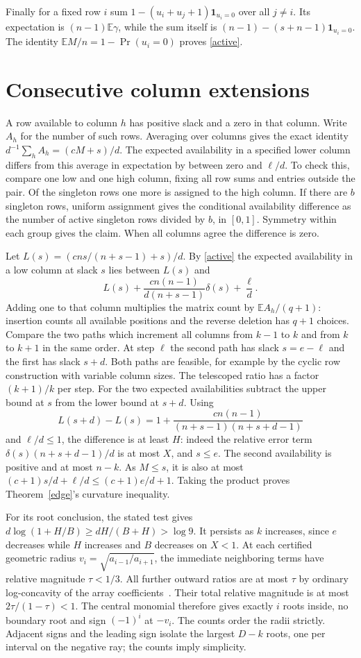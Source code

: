 \documentclass[11pt]{article}
\newcommand{\E}{\mathbb E}
\begin{document}
Finally for a fixed row $i$ sum $1-(u_i+u_j+1)\mathbf1_{u_i=0}$ over all $j\ne i$. Its expectation is $(n-1)\E\gamma$, while the sum itself is $(n-1)-(s+n-1)\mathbf1_{u_i=0}$. The identity $\E M/n=1-\Pr(u_i=0)$ proves \eqref{active}.

\section{Consecutive column extensions}
A row available to column $h$ has positive slack and a zero in that column. Write $A_h$ for the number of such rows. Averaging over columns gives the exact identity $d^{-1}\sum_h A_h=(cM+s)/d$. The expected availability in a specified lower column differs from this average in expectation by between zero and $\ell/d$. To check this, compare one low and one high column, fixing all row sums and entries outside the pair. Of the singleton rows one more is assigned to the high column. If there are $b$ singleton rows, uniform assignment gives the conditional availability difference as the number of active singleton rows divided by $b$, in $[0,1]$. Symmetry within each group gives the claim. When all columns agree the difference is zero.

Let $L(s)=(cns/(n+s-1)+s)/d$. By \eqref{active} the expected availability in a low column at slack $s$ lies between $L(s)$ and
\[
 L(s)+\frac{c n(n-1)}{d(n+s-1)}\delta(s)+\frac\ell d.
\]
Adding one to that column multiplies the matrix count by $\E A_h/(q+1)$: insertion counts all available positions and the reverse deletion has $q+1$ choices. Compare the two paths which increment all columns from $k-1$ to $k$ and from $k$ to $k+1$ in the same order. At step $\ell$ the second path has slack $s=e-\ell$ and the first has slack $s+d$. Both paths are feasible, for example by the cyclic row construction with variable column sizes. The telescoped ratio has a factor $(k+1)/k$ per step. For the two expected availabilities subtract the upper bound at $s$ from the lower bound at $s+d$. Using
\[
 L(s+d)-L(s)=1+\frac{c n(n-1)}{(n+s-1)(n+s+d-1)}
\]
and $\ell/d\le1$, the difference is at least $H$: indeed the relative error term $\delta(s)(n+s+d-1)/d$ is at most $X$, and $s\le e$. The second availability is positive and at most $n-k$. As $M\le s$, it is also at most $(c+1)s/d+\ell/d\le(c+1)e/d+1$. Taking the product proves Theorem~\ref{edge}'s curvature inequality.

For its root conclusion, the stated test gives $d\log(1+H/B)\ge dH/(B+H)>\log9$. It persists as $k$ increases, since $e$ decreases while $H$ increases and $B$ decreases on $X<1$. At each certified geometric radius $v_i=\sqrt{a_{i-1}/a_{i+1}}$, the immediate neighboring terms have relative magnitude $\tau<1/3$. All further outward ratios are at most $\tau$ by ordinary log-concavity of the array coefficients~\cite{orient}. Their total relative magnitude is at most $2\tau/(1-\tau)<1$. The central monomial therefore gives exactly $i$ roots inside, no boundary root and sign $(-1)^i$ at $-v_i$. The counts order the radii strictly. Adjacent signs and the leading sign isolate the largest $D-k$ roots, one per interval on the negative ray; the counts imply simplicity.
\end{document}
